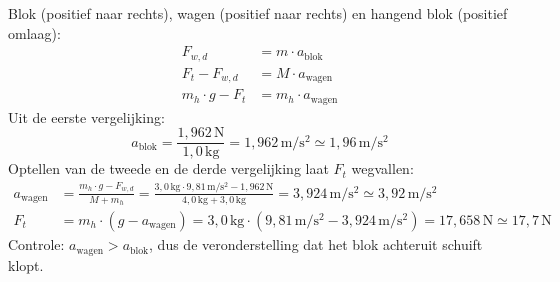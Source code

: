 \documentclass{ximera}
\begin{document}
\begin{exercise}
\begin{question}
\begin{solution}
            Blok (positief naar rechts), wagen (positief naar rechts) en hangend blok (positief omlaag):
            \begin{align*}
                F_{w,d} &= m \cdot a_{\text{blok}} \\
                F_{t} - F_{w,d} &= M \cdot a_{\text{wagen}} \\
                m_{h} \cdot g - F_{t} &= m_{h} \cdot a_{\text{wagen}}
            \end{align*}
            Uit de eerste vergelijking:
            \[
                a_{\text{blok}} = \frac{1{,}962 \, \mathrm{N}}{1{,}0 \, \mathrm{kg}} = 1{,}962 \, \mathrm{m/s^2} \simeq 1{,}96 \, \mathrm{m/s^2}
            \]
            Optellen van de tweede en de derde vergelijking laat $F_{t}$ wegvallen:
            \begin{align*}
                a_{\text{wagen}} &= \frac{m_{h} \cdot g - F_{w,d}}{M + m_{h}} = \frac{3{,}0 \, \mathrm{kg} \cdot 9{,}81 \, \mathrm{m/s^2} - 1{,}962 \, \mathrm{N}}{4{,}0 \, \mathrm{kg} + 3{,}0 \, \mathrm{kg}} = 3{,}924 \, \mathrm{m/s^2} \simeq 3{,}92 \, \mathrm{m/s^2} \\
                F_{t} &= m_{h} \cdot (g - a_{\text{wagen}}) = 3{,}0 \, \mathrm{kg} \cdot (9{,}81 \, \mathrm{m/s^2} - 3{,}924 \, \mathrm{m/s^2}) = 17{,}658 \, \mathrm{N} \simeq 17{,}7 \, \mathrm{N}
            \end{align*}
            Controle: $a_{\text{wagen}} > a_{\text{blok}}$, dus de veronderstelling dat het blok achteruit schuift klopt.
        \end{solution}
    \end{question}
\end{exercise}
\end{document}
